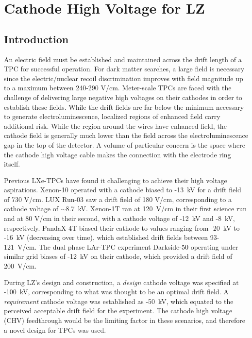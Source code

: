\chapter{Cathode High Voltage for LZ}
\label{chap:chv}

\section{Introduction}
An electric field must be established and maintained across the drift length of a TPC for successful operation.
For dark matter searches, a large field is necessary since the electric/nuclear recoil discrimination improves with field magnitude up to a maximum between 240-290 V/cm\cite{lux_collaboration_discrimination_2020}.
Meter-scale TPCs are faced with the challenge of delivering large negative high voltages on their cathodes in order to establish these fields.
While the drift fields are far below the minimum necessary to generate electroluminescence, localized regions of enhanced field carry additional risk.
While the region around the wires have enhanced field, the cathode field is generally much lower than the field across the electroluminescence gap in the top of the detector.
A volume of particular concern is the space where the cathode high voltage cable makes the connection with the electrode ring itself.

Previous LXe-TPCs have  found it challenging to achieve their high voltage aspirations.
Xenon-10 operated with a cathode biased to -13~kV for a drift field of 730 V/cm\cite{aprile_design_2011}.
LUX Run-03 saw a drift field of 180 V/cm\cite{the_lux_collaboration_improved_2020}, corresponding to a cathode voltage of $\sim$8.7~kV.
Xenon-1T\cite{aprile_xenon1t_2019} ran at 120~V/cm in their first science run and at 80 V/cm in their second, with a cathode voltage of -12~kV and -8~kV, respectively. 
PandaX-4T \cite{meng_dark_2021} biased their cathode to values ranging from -20~kV to -16~kV (decreasing over time), which established drift fields between 93-121~V/cm.
The dual phase LAr-TPC experiment Darkside-50\cite{the_darkside_collaboration_darkside-50_2018} operating under similar grid biases of -12~kV on their cathode, which provided a drift field of 200~V/cm.


During LZ's design and construction, a \textit{design} cathode voltage was specified at -100~kV, corresponding to what was thought to be an optimal drift field.
A \textit{requirement} cathode voltage was established as -50~kV, which equated to the perceived acceptable drift field for the experiment.
The cathode high voltage (CHV) feedthrough would be the limiting factor in these scenarios, and therefore a novel design for TPCs was used.

